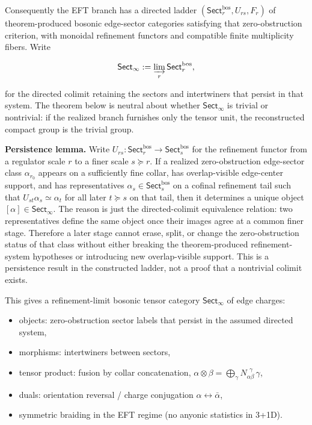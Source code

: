 Consequently the EFT branch has a directed ladder \((\mathsf{Sect}^{\mathrm{bos}}_r,U_{rs},F_r)\) of theorem-produced bosonic edge-sector categories satisfying that zero-obstruction criterion, with monoidal refinement functors and compatible finite multiplicity fibers. Write

\[
\mathsf{Sect}_\infty := \varinjlim_r \mathsf{Sect}^{\mathrm{bos}}_r,
\]

for the directed colimit retaining the sectors and intertwiners that persist in that system. The theorem below is neutral about whether \(\mathsf{Sect}_\infty\) is trivial or nontrivial: if the realized branch furnishes only the tensor unit, the reconstructed compact group is the trivial group.

\textbf{Persistence lemma.} Write \(U_{rs}:\mathsf{Sect}^{\mathrm{bos}}_r\to\mathsf{Sect}^{\mathrm{bos}}_s\) for the refinement functor from a regulator scale \(r\) to a finer scale \(s\succeq r\). If a realized zero-obstruction edge-sector class \(\alpha_{r_0}\) appears on a sufficiently fine collar, has overlap-visible edge-center support, and has representatives \(\alpha_s\in\mathsf{Sect}^{\mathrm{bos}}_s\) on a cofinal refinement tail such that \(U_{st}\alpha_s\simeq\alpha_t\) for all later \(t\succeq s\) on that tail, then it determines a unique object \([\alpha]\in\mathsf{Sect}_\infty\). The reason is just the directed-colimit equivalence relation: two representatives define the same object once their images agree at a common finer stage. Therefore a later stage cannot erase, split, or change the zero-obstruction status of that class without either breaking the theorem-produced refinement-system hypotheses or introducing new overlap-visible support. This is a persistence result in the constructed ladder, not a proof that a nontrivial colimit exists.

This gives a refinement-limit bosonic tensor category \(\mathsf{Sect}_\infty\) of edge charges:

\begin{itemize}
\tightlist
\item
  objects: zero-obstruction sector labels that persist in the assumed directed system,
\item
  morphisms: intertwiners between sectors,
\item
  tensor product: fusion by collar concatenation, \(\alpha \otimes \beta = \bigoplus_\gamma N_{\alpha\beta}^{\ \ \gamma}\,\gamma\),
\item
  duals: orientation reversal / charge conjugation \(\alpha \leftrightarrow \bar\alpha\),
\item
  symmetric braiding in the EFT regime (no anyonic statistics in 3+1D).
\end{itemize}

